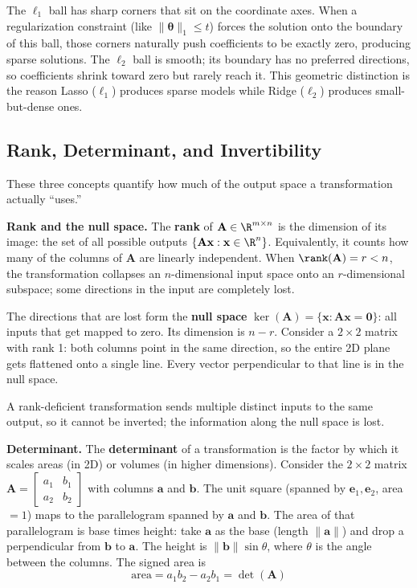 \documentclass[main.tex]{subfiles}
\begin{document}
The $\ell_1$ ball has sharp corners that sit on the coordinate axes. When a regularization constraint (like $\|\boldsymbol{\theta}\|_1 \leq t$) forces the solution onto the boundary of this ball, those corners naturally push coefficients to be exactly zero, producing sparse solutions. The $\ell_2$ ball is smooth; its boundary has no preferred directions, so coefficients shrink toward zero but rarely reach it. This geometric distinction is the reason Lasso ($\ell_1$) produces sparse models while Ridge ($\ell_2$) produces small-but-dense ones.

\subsection{Rank, Determinant, and Invertibility}

These three concepts quantify how much of the output space a transformation actually ``uses.''

\textbf{Rank and the null space.} The \textbf{rank} of $\mathbf{A} \in \R^{m \times n}$ is the dimension of its image: the set of all possible outputs $\{\mathbf{A}\mathbf{x} : \mathbf{x} \in \R^n\}$. Equivalently, it counts how many of the columns of $\mathbf{A}$ are linearly independent. When $\rank(\mathbf{A}) = r < n$, the transformation collapses an $n$-dimensional input space onto an $r$-dimensional subspace; some directions in the input are completely lost.

The directions that are lost form the \textbf{null space} $\ker(\mathbf{A}) = \{\mathbf{x} : \mathbf{A}\mathbf{x} = \mathbf{0}\}$: all inputs that get mapped to zero. Its dimension is $n - r$. Consider a $2 \times 2$ matrix with rank 1: both columns point in the same direction, so the entire 2D plane gets flattened onto a single line. Every vector perpendicular to that line is in the null space.

A rank-deficient transformation sends multiple distinct inputs to the same output, so it cannot be inverted; the information along the null space is lost.

\textbf{Determinant.} The \textbf{determinant} of a transformation is the factor by which it scales areas (in 2D) or volumes (in higher dimensions). Consider the $2 \times 2$ matrix $\mathbf{A} = \begin{bmatrix} a_{1} & b_{1} \\ a_{2} & b_{2} \end{bmatrix}$ with columns $\mathbf{a}$ and $\mathbf{b}$. The unit square (spanned by $\mathbf{e}_1, \mathbf{e}_2$, area $= 1$) maps to the parallelogram spanned by $\mathbf{a}$ and $\mathbf{b}$. The area of that parallelogram is base times height: take $\mathbf{a}$ as the base (length $\|\mathbf{a}\|$) and drop a perpendicular from $\mathbf{b}$ to $\mathbf{a}$. The height is $\|\mathbf{b}\|\sin\theta$, where $\theta$ is the angle between the columns. The signed area is
$$\text{area} = a_1 b_2 - a_2 b_1 = \det(\mathbf{A})$$
\end{document}
